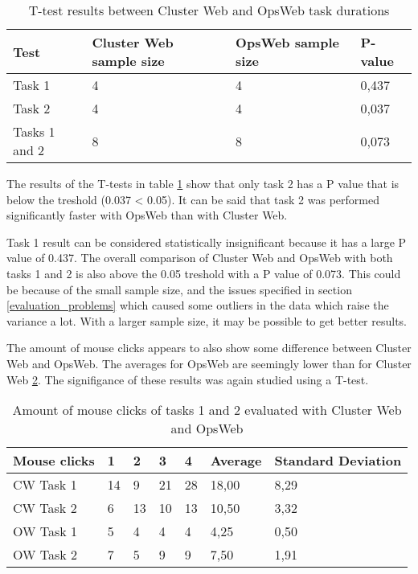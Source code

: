 \begin{table}[!ht]
\def\arraystretch{1.1}%
    \begin{center}
    \caption{T-test results between Cluster Web and OpsWeb task durations}
    \label{cw_ow_times_t_test}
    \begin{tabular}{| l | l | l | l | }
    \hline
    Test & Cluster Web sample size & OpsWeb sample size  & P-value   \\
    \hline
    Task 1 & 4 & 4 & 0,437 \\
    Task 2 & 4 & 4 &  0,037\\
    Tasks 1 and 2 & 8 & 8 & 0,073\\
    \hline
    \end{tabular}
    \end{center}
\end{table}

The results of the T-tests in table \ref{cw_ow_times_t_test} show that only task 2 has a P value that is below the treshold (0.037 < 0.05). It can be said that task 2 was performed significantly faster with OpsWeb than with Cluster Web.

Task 1 result can be considered statistically insignificant because it has a large P value of 0.437. The overall comparison of Cluster Web and OpsWeb with both tasks 1 and 2 is also above the 0.05 treshold with a P value of 0.073. This could be because of the small sample size, and the issues specified in section \ref{evaluation_problems} which caused some outliers in the data which raise the variance a lot. With a larger sample size, it may be possible to get better results.

The amount of mouse clicks appears to also show some difference between Cluster Web and OpsWeb. The averages for OpsWeb are seemingly lower than for Cluster Web \ref{cw_ow_clicks}. The signifigance of these results was again studied using a T-test.

\begin{table}[!ht]
\def\arraystretch{1.1}%
    \begin{center}
    \caption{Amount of mouse clicks of tasks 1 and 2 evaluated with Cluster Web and OpsWeb}
    \label{cw_ow_clicks}
    \begin{tabular}{| l | l | l | l | l | l | l | }
    \hline
    Mouse clicks & 1  & 2  & 3  & 4  & Average & Standard Deviation \\
    \hline
    CW Task 1    & 14 & 9  & 21 & 28 & 18,00   & 8,29               \\
    CW Task 2    & 6  & 13 & 10 & 13 & 10,50   & 3,32               \\
    OW Task 1    & 5  & 4  & 4  & 4  & 4,25    & 0,50               \\
    OW Task 2    & 7  & 5  & 9  & 9  & 7,50    & 1,91            \\
    \hline
    \end{tabular}
    \end{center}
\end{table}

